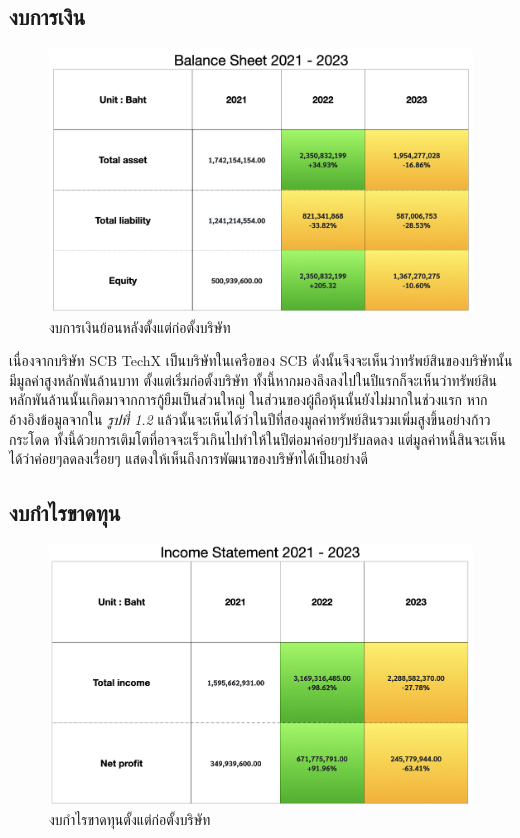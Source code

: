 \subsection{งบการเงิน}
\begin{figure}[ht]
    \begin{center}
        \includegraphics[scale=0.4]{images/balance.png}
    \end{center}
    \caption[งบการเงินย้อนหลังตั้งแต่ก่อตั้งบริษัท]{งบการเงินย้อนหลังตั้งแต่ก่อตั้งบริษัท}
\end{figure}
เนื่องจากบริษัท SCB TechX เป็นบริษัทในเครือของ SCB ดังนั้นจึงจะเห็นว่าทรัพย์สินของบริษัทนั้นมีมูลค่าสูงหลักพันล้านบาท ตั้งแต่เริ่มก่อตั้งบริษัท ทั้งนี้หากมองลึงลงไปในปีแรกก็จะเห็นว่าทรัพย์สินหลักพันล้านนั้นเกิดมาจากการกู้ยืมเป็นส่วนใหญ่ ในส่วนของผู้ถือหุ้นนั้นยังไม่มากในช่วงแรก หากอ้างอิงข้อมูลจากใน \textit{รูปที่ 1.2 }แล้วนั้นจะเห็นได้ว่าในปีที่สองมูลค่าทรัพย์สินรวมเพิ่มสูงขึ้นอย่างก้าวกระโดด ทั้งนี้ด้วยการเติมโตที่อาจจะเร็วเกินไปทำให้ในปีต่อมาค่อยๆปรับลดลง  แต่มูลค่าหนี้สินจะเห็นได้ว่าค่อยๆลดลงเรื่อยๆ แสดงให้เห็นถึงการพัฒนาของบริษัทได้เป็นอย่างดี

\clearpage

\subsection{งบกำไรขาดทุน}
\begin{figure}[ht]
    \begin{center}
        \includegraphics[scale=0.4]{images/profit.png}
    \end{center}
    \caption[งบกำไรขาดทุนย้อนหลังตั้งแต่ก่อตั้งบริษัท]{งบกำไรขาดทุนตั้งแต่ก่อตั้งบริษัท}
\end{figure}



